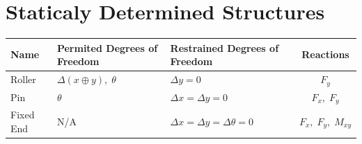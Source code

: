 \documentclass{article}
\begin{document}
    \section{Staticaly Determined Structures}
        \begin{table}[H]
            \centering
            \begin{tabularx}{\textwidth}{| X | L | L | c |}
                \hline
                \textbf{Name} & 
                \textbf{Permited Degrees of Freedom} & 
                \textbf{Restrained Degrees of Freedom} &
                \textbf{Reactions} \\
                \hline
                Roller & 
                $\Delta(x \oplus y),\;\theta$ &
                $\Delta y = 0$ &
                $F_y$ \\
                \hline
                Pin &
                $\theta$ &
                $\Delta x = \Delta y = 0$ &
                $F_x,\;F_y$ \\
                \hline 
                Fixed End &
                N/A &
                $\Delta x = \Delta y = \Delta \theta = 0$ &
                $F_x,\;F_y,\;M_{xy}$ \\
                \hline
            \end{tabularx}
        \end{table}
\end{document}
